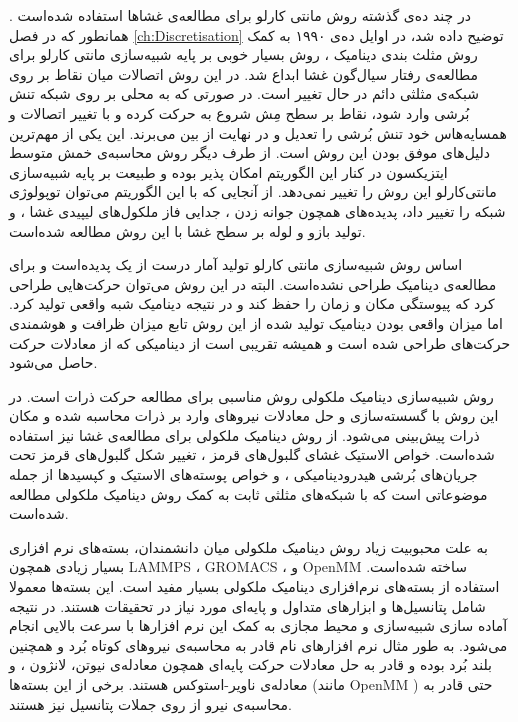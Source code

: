 در چند ده‌ی گذشته روش‌ مانتی‌ کارلو برای مطالعه‌ی غشا‌ها استفاده شده‌است
\cite{Canham1970, Evans1974, schneider1984, Nelson1987PRA, NelsonPRL1987, Gompper1991, Gompper1992Science, Lim2002PNAS, Gompper2005PRE}
. همانطور که در فصل 
\ref{ch:Discretisation}
توضیح داده شد، در اوایل ده‌ی ۱۹۹۰ به کمک روش مثلث بندی دینامیک
\cite{Boal1992PRA, Gompper1992Science}
، روش‌ بسیار خوبی بر پایه شبیه‌سازی مانتی کارلو برای مطالعه‌ی رفتار سیال‌گون غشا ابداع شد. در این روش اتصالات میان نقاط بر روی شبکه‌ی مثلثی دائم در حال تغییر است. در صورتی که به محلی بر روی شبکه تنش بُرشی وارد شود، نقاط بر سطح مِش شروع به حرکت کرده و با تغییر اتصالات و همسایه‌هاس خود تنش بُرشی را تعدیل و در نهایت از بین می‌برند. این یکی از مهم‌ترین دلیل‌های موفق بودن این روش است. از طرف دیگر روش محاسبه‌ی خمش متوسط ایتزیکسون
\cite{Gompper1992Science}
در کنار این الگوریتم امکان پذیر بوده و طبیعت بر پایه شبیه‌سازی مانتی‌کارلو این روش را تغییر نمی‌دهد. از آنجایی که با این الگوریتم می‌توان توپولوژی شبکه را تغییر داد، پدیده‌های همچون جوانه زدن
، جدایی فاز ملکول‌های لیپیدی غشا
\cite{Kohyama2003PRE, Gompper2007PRL, Laradji2004PRL}
، و تولید بازو‌ و لوله‌ 
بر سطح غشا
\cite{Ramakrishnan2013BiophysJ}
با این روش مطالعه شده‌است. 

اساس روش شبیه‌سازی مانتی کارلو تولید آمار درست از یک پدیده‌است و برای مطالعه‌ی دینامیک طراحی نشده‌است. البته در این روش می‌توان حرکت‌هایی طراحی کرد که پیوستگی مکان و زمان را حفظ کند و در نتیجه دینامیک شبه  واقعی تولید کرد. اما میزان واقعی بودن دینامیک تولید شده از این روش تابع میزان ظرافت و هوشمندی  حرکت‌های طراحی شده است و همیشه تقریبی است از دینامیکی که از معادلات حرکت حاصل می‌شود.

روش شبیه‌سازی دینامیک ملکولی روش مناسبی برای مطالعه حرکت ذرات است. در این روش با گسسته‌سازی و حل معادلات نیرو‌های وارد بر ذرات محاسبه شده و  مکان ذرات پیش‌بینی  می‌شود. از روش دینامیک ملکولی برای مطالعه‌ی غشا نیز استفاده شده‌است. خواص الاستیک غشای گلبول‌های قرمز
\cite{Hale2009SoftMatter, Geekiyanage2019PLOS}
، تغییر شکل گلبول‌های قرمز تحت جریان‌های بُرشی هیدرودینامیکی 
\cite{Noguchi2005PNAS}
، و  خواص پوسته‌های الاستیک و کپسید‌ها
\cite{NelsonPRL1987, gomppernelson2012}
از جمله موضوعاتی است که با شبکه‌های مثلثی ثابت به کمک روش دینامیک ملکولی مطالعه شده‌است.

به علت محبوبیت زیاد روش دینامیک ملکولی میان دانشمندان، بسته‌های نرم‌ افزار‌ی بسیار زیادی همچون 
LAMMPS \cite{LAMMPS}
،
GROMACS \cite{GROMACS}
، و
OpenMM \cite{OpenMM2017}
ساخته‌ شده‌است. استفاده از بسته‌های نرم‌افزاری دینامیک ملکولی بسیار مفید است. این بسته‌ها معمولا شامل پتانسیل‌ها و ابزار‌های متداول و پایه‌ای مورد نیاز در تحقیقات هستند. در نتیجه آماده سازی شبیه‌سازی و محیط مجازی به کمک این نرم افزار‌ها با سرعت بالایی انجام می‌شود. به طور مثال نرم افزار‌های نام قادر به محاسبه‌ی نیروهای کوتاه بُرد و همچنین بلند بُرد بوده و قادر به حل معادلات حرکت پایه‌ای همچون معادله‌ی نیوتن، لانژون
، و معادله‌ی ناویر-استوکس
هستند. برخی از این بسته‌ها (مانند 
OpenMM
) حتی قادر به محاسبه‌ی نیرو از روی جملات پتانسیل نیز هستند. 


